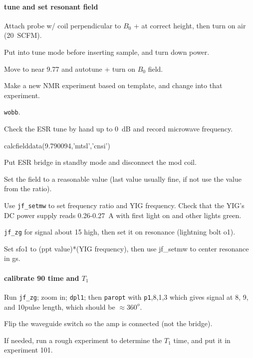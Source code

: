 \paragraph{tune and set resonant field}
Attach probe w/ coil perpendicular to $B_0$ + at correct height, then turn on air (20~SCFM).

Put into tune mode before inserting sample, and turn down power.

Move to near 9.77 and autotune + turn on $B_0$ field.

Make a new NMR experiment based on template, and change into that experiment.

\texttt{wobb}. 

Check the ESR tune by hand up to 0~dB and record microwave frequency.
\begin{python}[off]
calcfielddata(9.790094,'mtsl','cnsi')
\end{python}
Put ESR bridge in standby mode and disconnect the mod coil.

Set the field to a reasonable value (last value usually fine, if not use the value from the ratio).

Use \texttt{jf\_setmw} to set frequency ratio and YIG frequency.
Check that the YIG's DC power supply reads 0.26-0.27~A with first light on and other lights green.

\texttt{jf\_zg} for signal about 15 high, then set it on resonance (lightning bolt o1).

Set sfo1 to (ppt value)*(YIG frequency), then use jf\_setmw to center resonance in gs.

\paragraph{calibrate 90 time and $T_1$}

Run \texttt{jf_zg}; zoom in; \texttt{dpl1}; then \texttt{paropt} with \texttt{p1},8,1,3 which gives signal at 8\us, 9\us, and 10\us pulse length, which should be $\approx 360^o$.

Flip the waveguide switch so the amp is connected (not the bridge).

If needed, run a rough experiment to determine the $T_1$ time, and put it in experiment 101.

